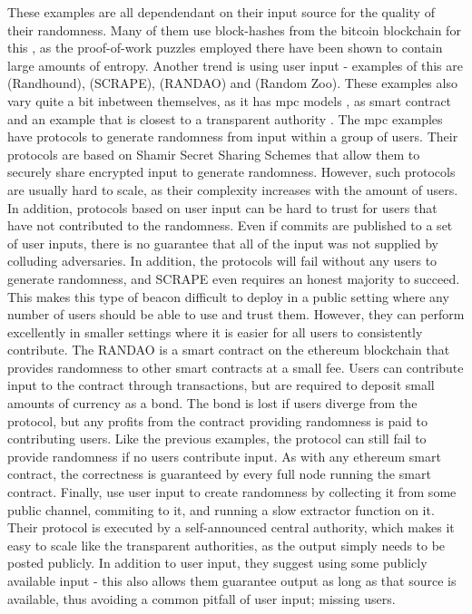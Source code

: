 These examples are all dependendant on their input source for the quality of their randomness. Many of them use block-hashes from the bitcoin blockchain for this \cite{bonneau2015bitcoin, bentov2016bitcoin, bunz2017proofsof}, as the proof-of-work puzzles employed there have been shown to contain large amounts of entropy\cite{bonneau2015bitcoin}.  %
Another trend is using user input - examples of this are \citet{syta2017scalable} (Randhound), \citet{cascudo2017scrape} (SCRAPE), \citet{randao} (RANDAO) and \citet{lenstra2015random} (Random Zoo). These examples also vary quite a bit inbetween themselves, as it has \gls{mpc} models \cite{syta2017scalable, cascudo2017scrape}, as smart contract \cite{randao} and an example that is closest to a transparent authority \cite{lenstra2015random}. The \gls{mpc} examples have protocols to generate randomness from input within a group of users. Their protocols are based on Shamir Secret Sharing Schemes that allow them to securely share encrypted input to generate randomness. However, such protocols are usually hard to scale, as their complexity increases with the amount of users. 
In addition, protocols based on user input can be hard to trust for users that have not contributed to the randomness. Even if commits are published to a set of user inputs, there is no guarantee that all of the input was not supplied by colluding adversaries. In addition, the protocols will fail without any users to generate randomness, and SCRAPE \cite{cascudo2017scrape} even requires an honest majority to succeed. This makes this type of beacon difficult to deploy in a public setting where any number of users should be able to use and trust them. However, they can perform excellently in smaller settings where it is easier for all users to consistently contribute. 
The RANDAO\cite{randao} is a smart contract on the ethereum blockchain that provides randomness to other smart contracts at a small fee. Users can contribute input to the contract through transactions, but are required to deposit small amounts of currency as a bond. The bond is lost if users diverge from the protocol, but any profits from the contract providing randomness is paid to contributing users. Like the previous examples, the protocol can still fail to provide randomness if no users contribute input. As with any ethereum smart contract, the correctness is guaranteed by every full node running the smart contract. 
Finally, \citet{lenstra2015random} use user input to create randomness by collecting it from some public channel, commiting to it, and running a slow extractor function on it. Their protocol is executed by a self-announced central authority, which makes it easy to scale like the transparent authorities, as the output simply needs to be posted publicly. In addition to user input, they suggest using some publicly available input - this also allows them guarantee output as long as that source is available, thus avoiding a common pitfall of user input; missing users. 
